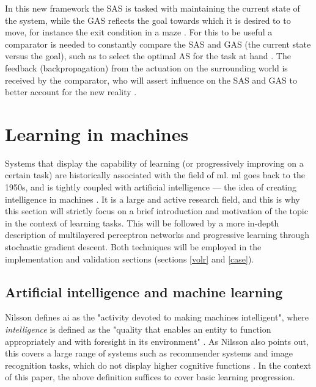 \documentclass[a4paper,oneside]{memoir}
\begin{document}
In this new framework the SAS is tasked with maintaining the current state
of the system, while the GAS reflects the goal towards which it is desired to
to move, for instance the exit condition in a maze \autocite{Mogensen2017}.
For this to be useful a comparator is needed to constantly compare the SAS
and GAS (the current state versus the goal), such as to select the optimal AS
for the task at hand \autocite{Mogensen2017}. The feedback (backpropagation)
from the actuation on the surrounding world is received by the comparator,
who will assert influence on the SAS and GAS to better account for the new
reality \autocite{Mogensen2017}.


\section{Learning in machines}
Systems that display the capability of learning (or progressively improving on
a certain task) are historically associated with the field of \gls{ml}.
\Gls{ml} goes back to the 1950s, and is tightly coupled
with artificial intelligence --- the idea of creating intelligence
in machines \autocite{Nilsson2009, russel2007}.
It is a large and active research field, and this is why this section will strictly
focus on a brief introduction and motivation of the topic in the context of
learning tasks. This will be followed by a more in-depth description of
multilayered perceptron networks and progressive learning through stochastic
gradient descent. Both techniques will be employed in the implementation
and validation sections (sections \ref{volr} and \ref{case}).

\subsection{Artificial intelligence and machine learning}
Nilsson defines \gls{ai} as the "activity devoted to making machines
intelligent", where \textit{intelligence} is defined as the "quality that
enables an entity to function appropriately and with foresight in its
environment" \autocite[13]{Nilsson2009}. As Nilsson also points out, this
covers a large range of systems such as recommender systems and image recognition
tasks, which do not display higher cognitive functions \autocite[13]{Nilsson2009}.
In the context of this paper, the above definition suffices to cover basic
learning progression.
\end{document}
